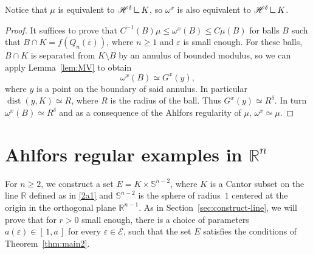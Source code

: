 \documentclass[JEP,XML,SOM,Unicode,published]{cedram}
\let\sm\setminus
\let\ol\overline
\numberwithin{equation}{section}
\theoremstyle{plain}
\theoremstyle{definition}
\newcommand{\R}{\mathbb{R}}
\let\sm\setminus
\DeclareMathOperator{\dist}{dist}
\newcommand{\R}{\mathbb{R}}
\renewcommand{\H}{\mathscr{H}}
\DeclareMathOperator{\dist}{dist}
\newcommand{\cE}{{\mathcal E}}
\newcommand{\mres}{\mathbin{\vrule height 1.6ex depth 0pt width
0.13ex\vrule height 0.13ex depth 0pt width 1.3ex}}
\begin{document}
Notice that $\mu$ is equivalent to $\H^{\delta}\mres K$, so $\omega^x$ is also equivalent
to $\H^{\delta}\mres K$.

\begin{proof}
It suffices to prove
that $C^{-1}(B) \mu \leq \omega^x(B) \leq C \mu(B)$ for
balls $B$ such that $B\cap K= f(Q_n(\ol \varepsilon))$, where $n\ge 1$ and $\varepsilon$ is small enough.
For these balls, $B\cap K$ is separated from $K\sm B$ by an annulus of bounded modulus, so we can apply
Lemma~\ref{lem:MV} to obtain\vspace*{-3pt}
\[
\omega^x(B) \simeq G^x(y),
\]
where $y$ is a point on the boundary of said annulus.
In particular $\dist(y,K)\simeq R$, where $R$ is the radius of the ball. Thus $G^x(y) \simeq R^\delta$.
In turn $\omega^x(B)\simeq R^\delta$ and as a consequence of the Ahlfors regularity of $\mu$, $\omega^x \simeq \mu$.
\end{proof}

\section{Ahlfors regular examples in \texorpdfstring{$\R^n$}{Rn}}
\label{Sn}

For $n\ge 2$, we construct a set $E= K\times \mathbb{S}^{n-2}$, where $K$ is a Cantor subset on the line
$\R$ defined as in \eqref{2a1} and $\mathbb{S}^{n-2}$ is the sphere of radius~$1$ centered at the origin
in the orthogonal plane $\R^{n-1}$.
As in Section~\eqref{sec:construct-line}, we will prove that for $r>0$ small enough, there is a choice of parameters $a(\varepsilon)\in [\, 1,a\,]$ for every $\varepsilon\in \cE$, such that the set $E$ satisfies the conditions of Theorem~\ref{thm:main2}.
\end{document}
